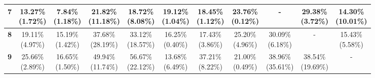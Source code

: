 \documentclass{report}
\begin{document}
\begin{center}
{\begin{tabular}{|c|c|c|c|c|c|c|c|c|c|c|}
\textbf{7} & \makecell{13.27\% \\ (1.72\%)} & \makecell{7.84\% \\ (1.18\%)} & \makecell{21.82\% \\ (11.18\%)} & \makecell{18.72\% \\ (8.08\%)} & \makecell{19.12\% \\ (1.04\%)} & \makecell{18.45\% \\ (1.12\%)} & \makecell{23.76\% \\ (0.12\%)} & - & \makecell{29.38\% \\ (3.72\%)} & \makecell{14.30\% \\ (10.01\%)} \\ \hline
\textbf{8} & \makecell{19.11\% \\ (4.97\%)} & \makecell{15.19\% \\ (1.42\%)} & \makecell{37.68\% \\ (28.19\%)} & \makecell{33.12\% \\ (18.57\%)} & \makecell{16.25\% \\ (0.40\%)} & \makecell{17.43\% \\ (3.86\%)} & \makecell{25.20\% \\ (4.96\%)} & \makecell{30.09\% \\ (6.18\%)} & - & \makecell{15.43\% \\ (5.58\%)} \\ \hline
\textbf{9} & \makecell{25.66\% \\ (2.89\%)} & \makecell{16.65\% \\ (1.50\%)} & \makecell{49.94\% \\ (11.74\%)} & \makecell{56.67\% \\ (22.12\%)} & \makecell{13.68\% \\ (6.49\%)} & \makecell{37.21\% \\ (8.22\%)} & \makecell{21.00\% \\ (0.49\%)} & \makecell{38.96\% \\ (35.61\%)} & \makecell{38.54\% \\ (19.69\%)} & - \\ \hline
  \end{tabular}
}
\end{center}
\end{document}

